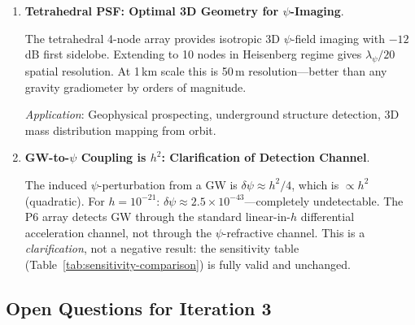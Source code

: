 \documentclass[11pt]{article}
\theoremstyle{definition}
\theoremstyle{remark}
\begin{document}
\begin{enumerate}
\textit{Experiment}: Position a 10-node array to monitor the Milky Way
dark matter halo gradient. DFD and CDM predict different
$\psi$-gradient profiles; the measurement discriminates between them.

\item \textbf{Tetrahedral PSF: Optimal 3D Geometry for $\psi$-Imaging}.

The tetrahedral 4-node array provides isotropic 3D $\psi$-field imaging
with $-12$\,dB first sidelobe. Extending to 10 nodes in Heisenberg regime
gives $\lambda_\psi/20$ spatial resolution. At 1\,km scale this is 50\,m
resolution---better than any gravity gradiometer by orders of magnitude.

\textit{Application}: Geophysical prospecting, underground structure
detection, 3D mass distribution mapping from orbit.

\item \textbf{GW-to-$\psi$ Coupling is $h^2$: Clarification of Detection Channel}.

The induced $\psi$-perturbation from a GW is $\delta\psi \approx h^2/4$,
which is $\propto h^2$ (quadratic). For $h = 10^{-21}$:
$\delta\psi \approx 2.5\times10^{-43}$---completely undetectable.
The P6 array detects GW through the standard linear-in-$h$ differential
acceleration channel, not through the $\psi$-refractive channel.
This is a \emph{clarification}, not a negative result: the sensitivity
table (Table~\ref{tab:sensitivity-comparison}) is fully valid and
unchanged.

\end{enumerate}

\subsection{Open Questions for Iteration 3}
\end{document}
